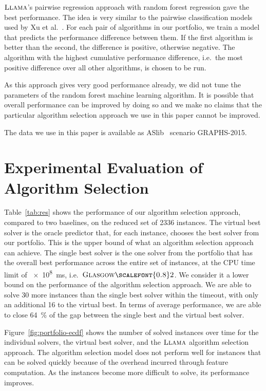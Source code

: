 \documentclass{llncs}
\newcommand{\GlasgowTwo}{$\textsc{Glasgow{\scalefont{0.8}2}}$\xspace}
\newcommand{\LLAMA}{$\textsc{Llama}$\xspace}
\begin{document}
\LLAMA's pairwise regression approach with random forest regression gave the best performance. The
idea is very similar to the pairwise classification models used by Xu et al.~\cite{xu_satzilla_2008}. For
each pair of algorithms in our portfolio, we train a model that predicts the performance difference
between them. If the first algorithm is better than the second, the difference is positive,
otherwise negative. The algorithm with the highest cumulative performance difference, i.e.\ the most
positive difference over all other algorithms, is chosen to be run.

As this approach gives very good performance already, we did not tune the parameters of the random
forest machine learning algorithm. It is possible that overall performance can be improved by doing
so and we make no claims that the particular algorithm selection approach we use in this paper
cannot be improved.

The data we use in this paper is available as ASlib~\cite{aslib} scenario GRAPHS-2015.

\section{Experimental Evaluation of Algorithm Selection}\label{sec:algsel-exps}

Table~\ref{tab:res} shows the performance of our algorithm selection approach,
compared to two baselines, on the reduced set of 2336 instances. The virtual
best solver is the oracle predictor that, for each instance, chooses the best
solver from our portfolio. This is the upper bound of what an algorithm
selection approach can achieve. The single best solver is the one solver from
the portfolio that has the overall best performance across the entire set of
instances, at the CPU time limit of \SI{e8}{\ms}, i.e.\ \GlasgowTwo. We consider
it a lower bound on the performance of the algorithm selection approach.  We are
able to solve 30 more instances than the single best solver within the timeout,
with only an additional 16 to the virtual best. In terms of average performance,
we are able to close \SI{64}{\percent} of the gap between the single best and
the virtual best solver.

Figure~\ref{fig:portfolio-ecdf} shows the number of solved instances over time
for the individual solvers, the virtual best solver, and the \LLAMA algorithm
selection approach. The algorithm selection model does not perform well for
instances that can be solved quickly because of the overhead incurred through
feature computation.  As the instances become more difficult to solve, its
performance improves.
\end{document}
